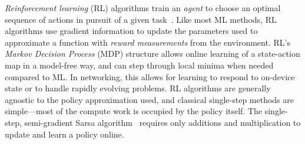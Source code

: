 \documentclass[
sigconf,natbib=false
,anonymous=true
,10pt
]{acmart}
\newcommand{\acval}[3]{\ensuremath{\operatorname{\hat{q}}(#1, #2, #3)}}
\newcommand{\acvalblank}{\ensuremath{\operatorname{\hat{q}}(\cdot)}}
\newcommand{\wvec}[1]{\ensuremath{\bm{w}_{#1}}}
\begin{document}
\emph{Reinforcement learning} (RL) algorithms train an \emph{agent} to choose an optimal sequence of actions in pursuit of a given task~\parencite{RL2E}.
Like most ML methods, RL algorithms use gradient information to update the parameters used to approximate a function with \emph{reward measurements} from the environment.
RL's \emph{Markov Decision Process} (MDP) structure allows online learning of a state-action map in a model-free way, and can step through local minima when needed compared to ML.
In networking, this allows for learning to respond to on-device state or to handle rapidly evolving problems.
RL algorithms are generally agnostic to the policy approximation used, and classical single-step methods are simple---most of the compute work is occupied by the policy itself.
The single-step, semi-gradient Sarsa algorithm~\cite[pp. \numrange{217}{221}]{RL2E} requires only additions and multiplication to update and learn a policy online.

\end{document}
